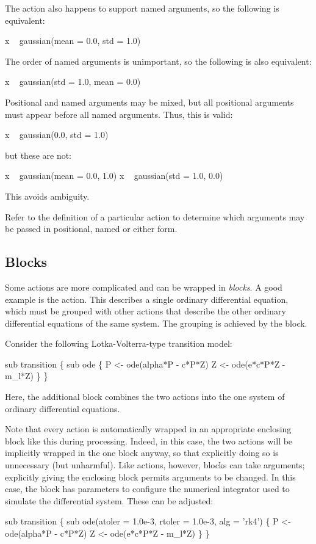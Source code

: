 The  action also happens to support named arguments, so
the following is equivalent:
\begin{bicode}
x ~ gaussian(mean = 0.0, std = 1.0)
\end{bicode}
The order of named arguments is unimportant, so the following is also
equivalent:
\begin{bicode}
x ~ gaussian(std = 1.0, mean = 0.0)
\end{bicode}

Positional and named arguments may be mixed, but all positional arguments must
appear before all named arguments. Thus, this is valid:
\begin{bicode}
x ~ gaussian(0.0, std = 1.0)
\end{bicode}
but these are not:
\begin{bicode}
x ~ gaussian(mean = 0.0, 1.0)
x ~ gaussian(std = 1.0, 0.0)
\end{bicode}
This avoids ambiguity.

Refer to the definition of a particular action to determine which arguments
may be passed in positional, named or either form.

\subsection{Blocks}

Some actions are more complicated and can be wrapped in \emph{blocks}. A
good example is the  action. This describes a single ordinary
differential equation, which must be
grouped with other actions that describe the other ordinary differential
equations of the same system. The grouping is achieved by the 
block.

Consider the following Lotka-Volterra-type transition
model:
\begin{bicode}
sub transition \{
  sub ode \{
    P <- ode(alpha*P - c*P*Z)
    Z <- ode(e*c*P*Z - m_l*Z)
  \}
\}
\end{bicode}
Here, the additional  block combines the two actions into the
one system of ordinary differential equations.

Note that every action is automatically wrapped in an appropriate enclosing
block like this during processing. Indeed, in this case, the two
 actions will be implicitly wrapped in the one 
block anyway, so that explicitly doing so is unnecessary (but unharmful). Like
actions, however, blocks can take arguments; explicitly giving the enclosing
block permits arguments to be changed. In this case, the  block
has parameters to configure the numerical integrator used to simulate the
differential system. These can be adjusted:
\begin{bicode}
sub transition \{
  sub ode(atoler = 1.0e-3, rtoler = 1.0e-3, alg = 'rk4') \{
    P <- ode(alpha*P - c*P*Z)
    Z <- ode(e*c*P*Z - m_l*Z)
  \}
\}
\end{bicode}

